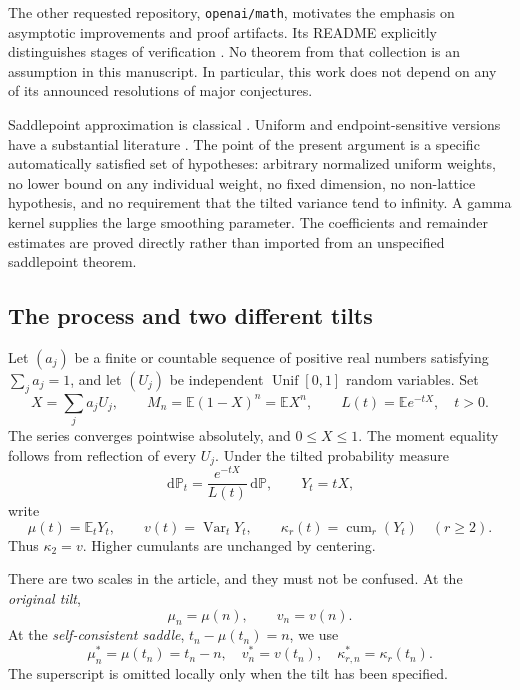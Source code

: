 \documentclass[11pt,a4paper]{article}
\numberwithin{equation}{section}
\theoremstyle{definition}\newtheorem{definition}[theorem]{Definition}
\theoremstyle{remark}\newtheorem{remark}[theorem]{Remark}
\newcommand{\E}{\mathbb E}
\newcommand{\Pp}{\mathbb P}
\newcommand{\Var}{\operatorname{Var}}
\newcommand{\dd}{\,\mathrm d}
\begin{document}
The other requested repository, \texttt{openai/math}, motivates the emphasis on asymptotic improvements and proof artifacts. Its README explicitly distinguishes stages of verification \cite{openaimath}. No theorem from that collection is an assumption in this manuscript. In particular, this work does not depend on any of its announced resolutions of major conjectures.

Saddlepoint approximation is classical \cite{daniels1954}. Uniform and endpoint-sensitive versions have a substantial literature \cite{jensen1988,jinrobinson1999}. The point of the present argument is a specific automatically satisfied set of hypotheses: arbitrary normalized uniform weights, no lower bound on any individual weight, no fixed dimension, no non-lattice hypothesis, and no requirement that the tilted variance tend to infinity. A gamma kernel supplies the large smoothing parameter. The coefficients and remainder estimates are proved directly rather than imported from an unspecified saddlepoint theorem.

\subsection{The process and two different tilts}
Let $(a_j)$ be a finite or countable sequence of positive real numbers satisfying $\sum_j a_j=1$, and let $(U_j)$ be independent $\operatorname{Unif}[0,1]$ random variables. Set
\begin{equation}\label{eq:model}
 X=\sum_j a_jU_j,\qquad M_n=\E(1-X)^n=\E X^n,\qquad
 L(t)=\E e^{-tX},\quad t>0.
\end{equation}
The series converges pointwise absolutely, and $0\le X\le1$. The moment equality follows from reflection of every $U_j$.
Under the tilted probability measure
\begin{equation}\label{eq:tilt}
 \dd\Pp_t=\frac{e^{-tX}}{L(t)}\dd\Pp,
 \qquad Y_t=tX,
\end{equation}
write
\begin{equation}\label{eq:cumulants}
 \mu(t)=\E_tY_t,\qquad v(t)=\Var_tY_t,
 \qquad \kappa_r(t)=\operatorname{cum}_r(Y_t)\quad(r\ge2).
\end{equation}
Thus $\kappa_2=v$. Higher cumulants are unchanged by centering.

There are two scales in the article, and they must not be confused. At the \emph{original tilt},
\[
 \mu_n=\mu(n),\qquad v_n=v(n).
\]
At the \emph{self-consistent saddle}, $t_n-\mu(t_n)=n$, we use
\[
 \mu_n^*=\mu(t_n)=t_n-n,\quad v_n^*=v(t_n),\quad
 \kappa_{r,n}^*=\kappa_r(t_n).
\]
The superscript is omitted locally only when the tilt has been specified.
\end{document}
